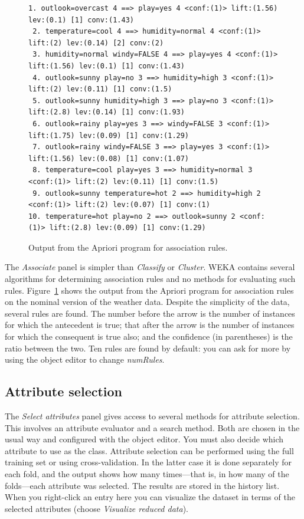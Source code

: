 \begin{figure}[!ht]
\begin{mdframed}[innermargin=-1.5cm]
\begin{Verbatim}[fontsize=\scriptsize]
 1. outlook=overcast 4 ==> play=yes 4 <conf:(1)> lift:(1.56) lev:(0.1) [1] conv:(1.43)
 2. temperature=cool 4 ==> humidity=normal 4 <conf:(1)> lift:(2) lev:(0.14) [2] conv:(2)
 3. humidity=normal windy=FALSE 4 ==> play=yes 4 <conf:(1)> lift:(1.56) lev:(0.1) [1] conv:(1.43)
 4. outlook=sunny play=no 3 ==> humidity=high 3 <conf:(1)> lift:(2) lev:(0.11) [1] conv:(1.5)
 5. outlook=sunny humidity=high 3 ==> play=no 3 <conf:(1)> lift:(2.8) lev:(0.14) [1] conv:(1.93)
 6. outlook=rainy play=yes 3 ==> windy=FALSE 3 <conf:(1)> lift:(1.75) lev:(0.09) [1] conv:(1.29)
 7. outlook=rainy windy=FALSE 3 ==> play=yes 3 <conf:(1)> lift:(1.56) lev:(0.08) [1] conv:(1.07)
 8. temperature=cool play=yes 3 ==> humidity=normal 3 <conf:(1)> lift:(2) lev:(0.11) [1] conv:(1.5)
 9. outlook=sunny temperature=hot 2 ==> humidity=high 2 <conf:(1)> lift:(2) lev:(0.07) [1] conv:(1)
10. temperature=hot play=no 2 ==> outlook=sunny 2 <conf:(1)> lift:(2.8) lev:(0.09) [1] conv:(1.29)
\end{Verbatim}
\end{mdframed}
\caption{\label{fig:apriori_output}Output from the Apriori program for association rules.}
\end{figure}

The \textit{Associate} panel is simpler than \textit{Classify} or
\textit{Cluster}. WEKA contains several algorithms for determining
association rules and no methods for evaluating such
rules. Figure~\ref{fig:apriori_output} shows the output from the
Apriori program for association rules on the nominal version of the
weather data. Despite the simplicity of the data, several rules are
found. The number before the arrow is the number of instances for
which the antecedent is true; that after the arrow is the number of
instances for which the consequent is true also; and the confidence
(in parentheses) is the ratio between the two. Ten rules are found by
default: you can ask for more by using the object editor to change
\textit{numRules}.

\subsection{Attribute selection}

The \textit{Select attributes} panel gives access to several methods
for attribute selection. This involves an attribute evaluator and a
search method. Both are chosen in the usual way and configured with
the object editor. You must also decide which attribute to use as the
class. Attribute selection can be performed using the full training
set or using cross-validation. In the latter case it is done
separately for each fold, and the output shows how many times---that is,
in how many of the folds---each attribute was selected. The results are
stored in the history list. When you right-click an entry here you can
visualize the dataset in terms of the selected attributes (choose
\textit{Visualize reduced data}).

